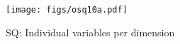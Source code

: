 \begin{figure}[]{}
    \centering
    \texttt{[image: figs/osq10a.pdf]}
    \caption{SQ: Individual variables per dimension}
    \label{fig:subfig-osq-a}
\end{figure}